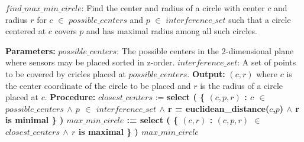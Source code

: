 
\begin{algorithm}[!htb] 
\caption{\textbf{$find\_max\_min\_circle$}: Find the center and radius of a circle with center $c$ and radius $r$ 
for $c$ $\in$ $possible\_centers$  and $p$  $\in$ $interference\_set$ such that 
a circle centered at $c$ covers $p$ and has maximal radius among all such circles.} 
\begin{algorithmic} 
\State \textbf{Parameters:} 
\State \tab  $possible\_centers$: The possible centers in the 2-dimensional plane 
\State \tab  where sensors may be placed sorted in z-order. 
\State \tab $interference\_set$: A set of points to be covered by cricles placed 
\State \tab \tab \tab at $possible\_centers$. 
\State \textbf{Output:} 
\State \tab $(c,r)$ where $c$ is the center coordinate of the circle to be placed and $r$ 
\State \tab is the radius of a circle placed at $c$.
\State \textbf{Procedure:} 
\State
\State $closest\_centers$ := \bf{select} ( \{ $(c,p,r)$ : $c$ $\in$ $possible\_centers$ 
\State \tab \tab \tab                       $\wedge$ $p$  $\in$ $interference\_set$ 
\State \tab \tab \tab                       $\wedge$ r = \bf{euclidean\_distance}($c$,$p$)
\State \tab \tab \tab                       $\wedge$ r is minimal \} )
\State $max\_min\_circle$ := \bf{select} ( \{ $(c,r)$ :
\State \tab \tab \tab 				      $(c,p,r)$ $\in$ $closest\_centers$ 
\State \tab \tab \tab                     $\wedge$ $r$ is maximal \} )
\State \Return $max\_min\_circle$ 
\end{algorithmic}
\end{algorithm}

